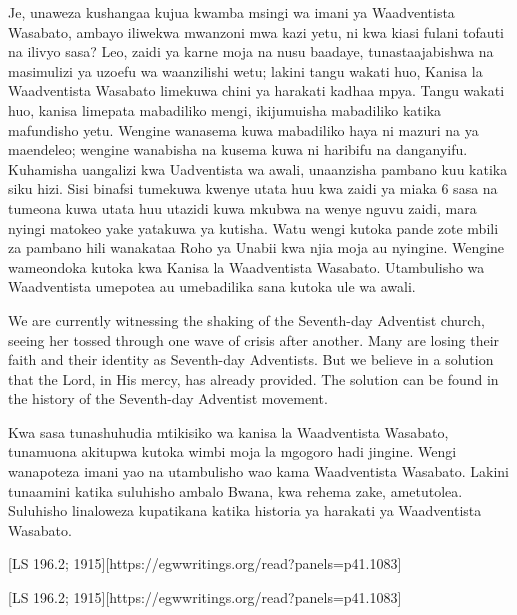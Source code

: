 Je, unaweza kushangaa kujua kwamba msingi wa imani ya Waadventista Wasabato, ambayo iliwekwa mwanzoni mwa kazi yetu, ni kwa kiasi fulani tofauti na ilivyo sasa? Leo, zaidi ya karne moja na nusu baadaye, tunastaajabishwa na masimulizi ya uzoefu wa waanzilishi wetu; lakini tangu wakati huo, Kanisa la Waadventista Wasabato limekuwa chini ya harakati kadhaa mpya. Tangu wakati huo, kanisa limepata mabadiliko mengi, ikijumuisha mabadiliko katika mafundisho yetu. Wengine wanasema kuwa mabadiliko haya ni mazuri na ya maendeleo; wengine wanabisha na kusema kuwa ni haribifu na danganyifu. Kuhamisha uangalizi kwa Uadventista wa awali, unaanzisha pambano kuu katika siku hizi. Sisi binafsi tumekuwa kwenye utata huu kwa zaidi ya miaka 6 sasa na tumeona kuwa utata huu utazidi kuwa mkubwa na wenye nguvu zaidi, mara nyingi matokeo yake yatakuwa ya kutisha. Watu wengi kutoka pande zote mbili za pambano hili wanakataa Roho ya Unabii kwa njia moja au nyingine. Wengine wameondoka kutoka kwa Kanisa la Waadventista Wasabato. Utambulisho wa Waadventista umepotea au umebadilika sana kutoka ule wa awali.


We are currently witnessing the shaking of the Seventh-day Adventist church, seeing her tossed through one wave of crisis after another. Many are losing their faith and their identity as Seventh-day Adventists. But we believe in a solution that the Lord, in His mercy, has already provided. The solution can be found in the history of the Seventh-day Adventist movement.


Kwa sasa tunashuhudia mtikisiko wa kanisa la Waadventista Wasabato, tunamuona akitupwa kutoka wimbi moja la mgogoro hadi jingine. Wengi wanapoteza imani yao na utambulisho wao kama Waadventista Wasabato. Lakini tunaamini katika suluhisho ambalo Bwana, kwa rehema zake, ametutolea. Suluhisho linaloweza kupatikana katika historia ya harakati ya Waadventista Wasabato.


[LS 196.2; 1915][https://egwwritings.org/read?panels=p41.1083]


[LS 196.2; 1915][https://egwwritings.org/read?panels=p41.1083]


